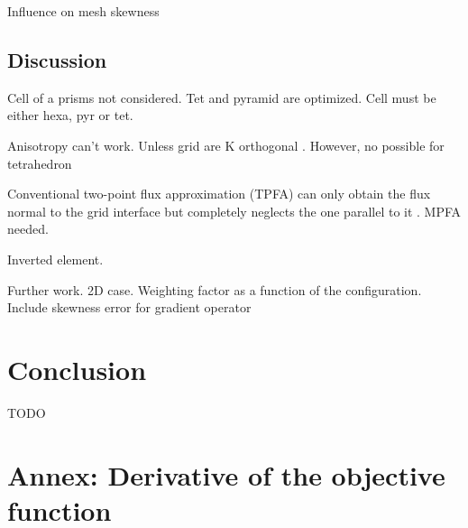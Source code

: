\documentclass[11pt]{article}
\begin{document}
Influence on mesh skewness

\subsection{Discussion}

Cell of a prisms not considered. Tet and pyramid are optimized. Cell must be either hexa, pyr or tet.

Anisotropy can't work.
Unless grid are K orthogonal \cite{heinemann_modelling_1991}.
However, no possible for tetrahedron

Conventional two-point flux approximation (TPFA) can only obtain the flux normal to the grid interface but completely neglects the one parallel to it \cite{}. MPFA needed. %

Inverted element.

Further work.
2D case.
Weighting factor as a function of the configuration.
Include skewness error for gradient operator


\section{Conclusion}

TODO







\clearpage


\section*{Annex: Derivative of the objective function}
\end{document}
